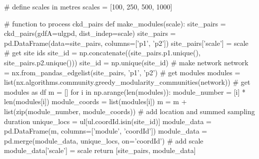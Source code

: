 \documentclass[]{article}
\newenvironment{Shaded}{}{}
\newcommand{\BuiltInTok}[1]{#1}
\newcommand{\CommentTok}[1]{\textcolor[rgb]{0.00,0.50,0.00}{#1}}
\newcommand{\ControlFlowTok}[1]{\textcolor[rgb]{0.00,0.00,1.00}{#1}}
\newcommand{\DecValTok}[1]{#1}
\newcommand{\KeywordTok}[1]{\textcolor[rgb]{0.00,0.00,1.00}{#1}}
\newcommand{\NormalTok}[1]{#1}
\newcommand{\OperatorTok}[1]{#1}
\newcommand{\StringTok}[1]{\textcolor[rgb]{0.00,0.50,0.50}{#1}}
\begin{document}
\begin{Shaded}
\begin{Highlighting}[numbers=left,,]
\CommentTok{# define scales in metres}
\NormalTok{scales }\OperatorTok{=}\NormalTok{ [}\DecValTok{100}\NormalTok{, }\DecValTok{250}\NormalTok{, }\DecValTok{500}\NormalTok{, }\DecValTok{1000}\NormalTok{]}


\CommentTok{# function to process ckd_pairs}
\KeywordTok{def}\NormalTok{ make_modules(scale):}
\NormalTok{    site_pairs }\OperatorTok{=}\NormalTok{ ckd_pairs(gdfA}\OperatorTok{=}\NormalTok{ulgpd, dist_indep}\OperatorTok{=}\NormalTok{scale)}
\NormalTok{    site_pairs }\OperatorTok{=}\NormalTok{ pd.DataFrame(data}\OperatorTok{=}\NormalTok{site_pairs, columns}\OperatorTok{=}\NormalTok{[}\StringTok{'p1'}\NormalTok{, }\StringTok{'p2'}\NormalTok{])}
\NormalTok{    site_pairs[}\StringTok{'scale'}\NormalTok{] }\OperatorTok{=}\NormalTok{ scale}
    \CommentTok{# get site ids}
\NormalTok{    site_id }\OperatorTok{=}\NormalTok{ np.concatenate((site_pairs.p1.unique(), site_pairs.p2.unique()))}
\NormalTok{    site_id }\OperatorTok{=}\NormalTok{ np.unique(site_id)}
    \CommentTok{# make network}
\NormalTok{    network }\OperatorTok{=}\NormalTok{ nx.from_pandas_edgelist(site_pairs, }\StringTok{'p1'}\NormalTok{, }\StringTok{'p2'}\NormalTok{)}
    \CommentTok{# get modules}
\NormalTok{    modules }\OperatorTok{=} \BuiltInTok{list}\NormalTok{(nx.algorithms.community.greedy_modularity_communities(network))}
    \CommentTok{# get modules as df}
\NormalTok{    m }\OperatorTok{=}\NormalTok{ []}
    \ControlFlowTok{for}\NormalTok{ i }\KeywordTok{in}\NormalTok{ np.arange(}\BuiltInTok{len}\NormalTok{(modules)):}
\NormalTok{        module_number }\OperatorTok{=}\NormalTok{ [i] }\OperatorTok{*} \BuiltInTok{len}\NormalTok{(modules[i])}
\NormalTok{        module_coords }\OperatorTok{=} \BuiltInTok{list}\NormalTok{(modules[i])}
\NormalTok{        m }\OperatorTok{=}\NormalTok{ m }\OperatorTok{+} \BuiltInTok{list}\NormalTok{(}\BuiltInTok{zip}\NormalTok{(module_number, module_coords))}
    \CommentTok{# add location and summed sampling duration}
\NormalTok{    unique_locs }\OperatorTok{=}\NormalTok{ ul[ul.coordId.isin(site_id)]}
\NormalTok{    module_data }\OperatorTok{=}\NormalTok{ pd.DataFrame(m, columns}\OperatorTok{=}\NormalTok{[}\StringTok{'module'}\NormalTok{, }\StringTok{'coordId'}\NormalTok{])}
\NormalTok{    module_data }\OperatorTok{=}\NormalTok{ pd.merge(module_data, unique_locs, on}\OperatorTok{=}\StringTok{'coordId'}\NormalTok{)}
    \CommentTok{# add scale}
\NormalTok{    module_data[}\StringTok{'scale'}\NormalTok{] }\OperatorTok{=}\NormalTok{ scale}
    \ControlFlowTok{return}\NormalTok{ [site_pairs, module_data]}



\end{Highlighting}
\end{Shaded}
\end{document}
